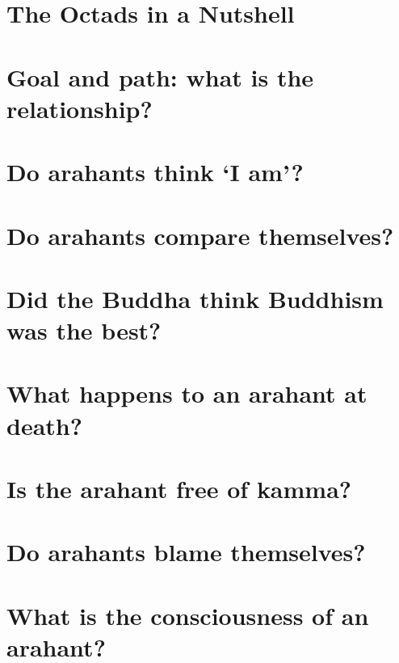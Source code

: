 \documentclass[10pt,twoside,final]{memoir}
\begin{document}
\midsloppy

\chapter{The Octads in a Nutshell}


\chapter{Goal and path: what is the relationship?}\label{goal-and-the-path}


\chapter{Do arahants think `I am'?}


\chapter{Do arahants compare themselves?}


\chapter{Did the Buddha think Buddhism was the best?}


\chapter{What happens to an arahant at death?}


\chapter{Is the arahant free of kamma?}\label{arahant-free-of-kamma}


\chapter{Do arahants blame themselves?}\label{arahant-blame-themselves}


\chapter{What is the consciousness of an arahant?}\label{arahant-consciousness}

\end{document}
